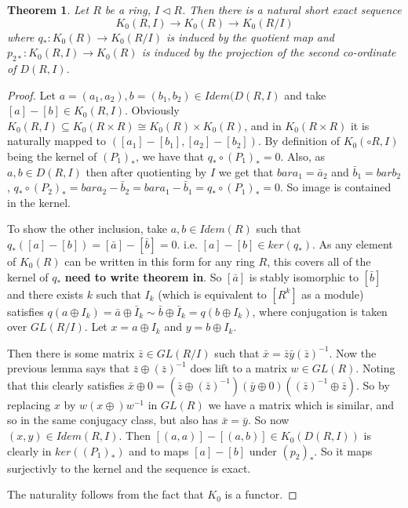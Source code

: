 \documentclass[a4paper,10pt]{article}
\newtheorem{thm}{Theorem}[subsection]
\begin{document}
\begin{thm}
Let $R$ be a ring, $I\triangleleft R$. Then there is a natural short exact sequence $$K_{0}(R,I)\rightarrow K_{0}(R) \rightarrow K_{0}(R/I)$$ where $q_{*}:K_{0}(R)\rightarrow K_{0}(R/I)$ is induced by the quotient map and $p_{2*}:K_{0}(R,I)\rightarrow K_{0}(R)$ is induced by the projection of the second co-ordinate of $D(R,I)$.
\end{thm}
\begin{proof}
Let $a=(a_{1},a_{2}),b=(b_{1},b_{2})\in Idem(D(R,I)$ and take $[a]-[b]\in K_{0}(R,I)$. Obviously $K_{0}(R,I)\subseteq K_{0}(R\times R)\cong K_{0}(R)\times K_{0}(R)$, and in $K_{0}(R\times R)$ it is naturally mapped to $([a_{1}]-[b_{1}],[a_{2}]-[b_{2}])$. By definition of $K_{0}(\circ R,I)$ being the kernel of $(P_{1})_{*}$, we have that $q_{*}\circ (P_{1})_{*}=0$. Also, as $a,b\in D(R,I)$ then after quotienting by $I$ we get that $bar{a}_{1}=\bar{a}_{2}$ and $\bar{b}_{1}=bar{b}_{2}$, $q_{*}\circ (P_{2})_{*}=bar{a}_{2}-\bar{b}_{2}=bar{a}_{1}-\bar{b}_{1}=q_{*}\circ (P_{1})_{*}=0$. So image is contained in the kernel.

To show the other inclusion, take $a,b\in Idem(R)$ such that $q_{*}([a]-[b])=[\bar{a}] -[\bar{b}]=0$. i.e. $[a]-[b]\in ker(q_{*})$. As any element of $K_{0}(R)$ can be written in this form for any ring $R$, this covers all of the kernel of $q_{*}$ \textbf{need to write theorem in}. So $[\bar{a}]$ is stably isomorphic to $[\bar{b}]$ and there exists $k$ such that $I_{k}$ (which is equivalent to $[R^{k}]$ as a module) satisfies $q(a\oplus I_{k})=\bar{a}\oplus \bar{I}_{k}\sim \bar{b}\oplus \bar{I}_{k}=q(b\oplus I_{k})$, where conjugation is taken over $GL(R/I)$. Let $x=a\oplus I_{k}$ and $y=b\oplus I_{k}$.

Then there is some matrix $\bar{z}\in GL(R/I)$ such that $\bar{x}=\bar{z}\bar{y}(\bar{z})^{-1}$. Now the previous lemma says that $\bar{z}\oplus(\bar{z})^{-1}$ does lift to a matrix $w\in GL(R)$. Noting that this clearly satisfies $\bar{x}\oplus 0=(\bar{z}\oplus(\bar{z})^{-1})(\bar{y}\oplus 0)((\bar{z})^{-1}\oplus\bar{z})$. So by replacing $x$ by $w(x\oplus)w^{-1}$ in $GL(R)$ we have a matrix which is similar, and so in the same conjugacy class, but also has $\bar{x}=\bar{y}$. So now $(x,y)\in Idem(R,I)$. Then $[(a,a)]-[(a,b)]\in K_{0}(D(R,I))$ is clearly in $ker((P_{1})_{*})$ and to maps $[a]-[b]$ under $(p_{2})_{*}$. So it maps surjectivly to the kernel and the sequence is exact.

The naturality follows from the fact that $K_{0}$ is a functor.
\end{proof}
\end{document}
